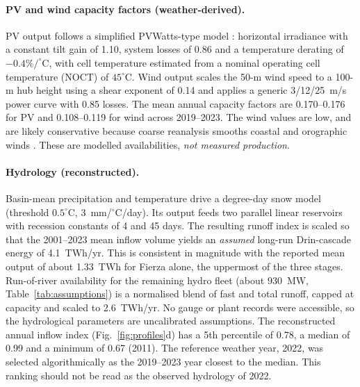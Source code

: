 \paragraph{PV and wind capacity factors (weather-derived).} PV output follows a simplified PVWatts-type model
\cite{dobos2014pvwatts}: horizontal irradiance with a constant tilt gain of 1.10, system losses of 0.86 and a
temperature derating of $-0.4\%/^\circ$C, with cell temperature estimated from a nominal operating cell
temperature (NOCT) of $45^\circ$C. Wind output scales the 50-m wind speed to a 100-m hub height using a shear
exponent of 0.14 and applies a generic 3/12/25~m/s power curve with 0.85 losses. The mean annual capacity
factors are 0.170--0.176 for PV and 0.108--0.119 for wind across 2019--2023. The wind values are low, and are
likely conservative because coarse reanalysis smooths coastal and orographic winds \cite{staffell2016wind}.
These are modelled availabilities, \emph{not measured production}.

\paragraph{Hydrology (reconstructed).} Basin-mean precipitation and temperature drive a degree-day snow model
\cite{hock2003melt} (threshold $0.5^\circ$C, 3~mm/$^\circ$C/day). Its output feeds two parallel linear
reservoirs \cite{beven2012rainfall} with recession constants of 4 and 45 days. The resulting runoff index is
scaled so that the 2001--2023 mean inflow volume yields an \emph{assumed} long-run Drin-cascade energy of
4.1~TWh/yr. This is consistent in magnitude with the reported mean output of about 1.33~TWh for Fierza alone,
the uppermost of the three stages. Run-of-river availability for the remaining hydro fleet (about 930~MW,
Table~\ref{tab:assumptions}) is a normalised blend of fast and total runoff, capped at capacity and scaled to
2.6~TWh/yr. No gauge or plant records were accessible, so the hydrological parameters are uncalibrated
assumptions. The reconstructed annual inflow index (Fig.~\ref{fig:profiles}d) has a 5th percentile of 0.78, a
median of 0.99 and a minimum of 0.67 (2011). The reference weather year, 2022, was selected algorithmically as
the 2019--2023 year closest to the median. This ranking should not be read as the observed hydrology of 2022.

